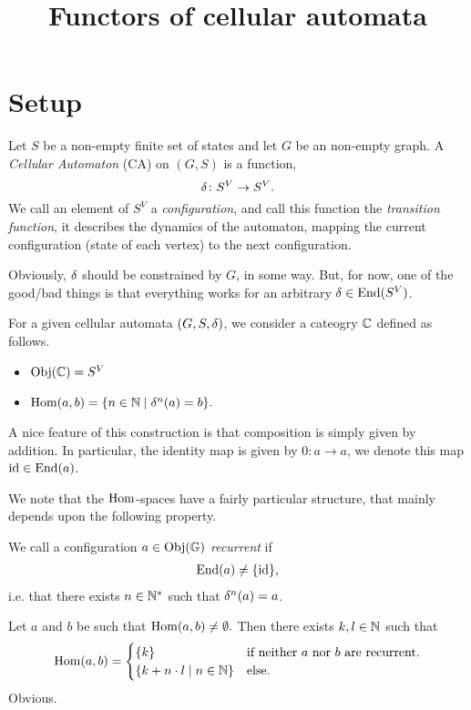 \documentclass[11pt,a4paper]{amsart}
\title{Functors of cellular automata}
\begin{document}
\maketitle

\section{Setup}
Let $S$ be a non-empty finite set of states and let $G$ be an non-empty graph. A \emph{Cellular Automaton} (CA) on $(G,S)$ is a function,
$$\delta \colon S^{V} \rightarrow S^{V}.$$
We call an element of $S^{V}$ a \emph{configuration}, and call this function the \emph{transition function}, it describes the dynamics of the automaton, mapping the current configuration (state of each vertex) to the next configuration. 

\begin{REM}
  \label{rem:contraints}
  Obviously, $\delta$ should be constrained by $G$, in some way. But, for now, one of the good/bad things is that everything works for an arbitrary $\delta \in \operatorname{End}(S^{V})$.
\end{REM}

For a given cellular automata $(G,S,\delta)$, we consider a cateogry $\mathbb{C}$ defined as follows. 
\begin{itemize}
\item $\operatorname{Obj}(\mathbb{C}) = S^{V}$
\item $\operatorname{Hom}(a,b) = \{n \in \mathbb{N} \mid \delta^n(a)=b \}.$
\end{itemize}
A nice feature of this construction is that composition is simply given by addition. In particular, the identity map is given by $0 \colon a \to a$, we denote this map  $\operatorname{id} \in \operatorname{End}(a)$.   

We note that the $\operatorname{Hom}$-spaces have a fairly particular structure, that mainly depends upon the following property.

\begin{DEF}
  \label{def:recurrent}
  We call a configuration $a \in \operatorname{Obj}(\mathbb{G})$ \emph{recurrent} if 
  \begin{align*}
    \operatorname{End}(a) \neq \{ \operatorname{id} \},
  \end{align*} i.e. that there exists $n \in \mathbb{N}^{*}$ such that $\delta^n(a)=a$.
\end{DEF}

\begin{PROP}
  \label{prop:hom-struct}
  Let $a$ and $b$ be such that $\operatorname{Hom}(a,b) \neq \emptyset.$ Then there exists $k, l \in \mathbb{N}$ such that
  \begin{align*}
    \operatorname{Hom}(a,b) = 
    \begin{cases}
      \{ k \} & \text{if neither $a$ nor $b$ are recurrent.}\\
      \{k + n\cdot l \mid n \in \mathbb{N}\} &\text{else.}
    \end{cases}
  \end{align*}
  \proof Obvious. \endproof
\end{PROP}
\end{document}
